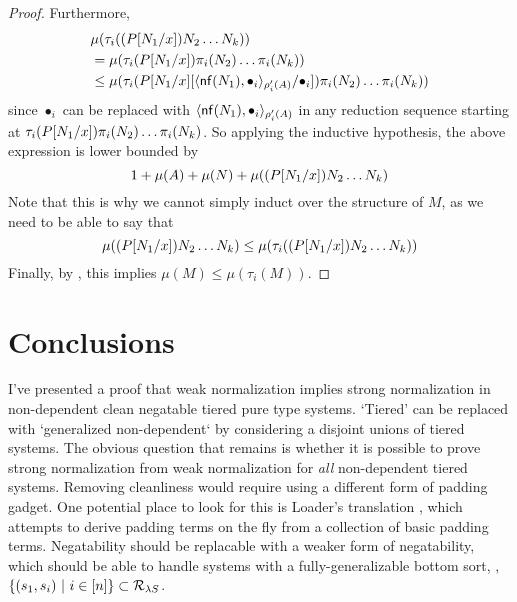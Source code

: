 \documentclass{article}
\begin{document}
\begin{proof}
Furthermore,
\begin{align*}
    & \mu(\tau_i((\sub P {N_1} x)N_2 \dots N_k)) \\ &=
     \mu(\tau_i(\sub P {N_1} x) \pi_i(N_2) \dots \pi_i(N_k)) \\ &\leq    
    \mu(\sub{\tau_i(\sub P {N_1} x} {\pair[\rho_i'(A)] {\mathsf{nf}(N_1)} {\bullet_i}} {\bullet_i}) \pi_i(N_2) \dots \pi_i(N_k))
\end{align*}
since $\bullet_i$ can be replaced with $\pair[\rho_i'(A)] {\mathsf{nf}(N_1)} {\bullet_i}$ in any reduction sequence starting at $\tau_i(\sub P {N_1} x) \pi_i(N_2) \dots \pi_i(N_k)$.
So applying the inductive hypothesis, the above expression is lower bounded by
\[
    1 + \mu(A) + \mu(N) + \mu((\sub P {N_1} x)N_2 \dots N_k)
\]
Note that this is why we cannot simply induct over the structure of $M$, as we need to be able to say that
\[
    \mu((\sub P {N_1} x)N_2 \dots N_k) \leq \mu(\tau_i((\sub P {N_1} x)N_2 \dots N_k))
\]
Finally, by , this implies $\mu(M) \leq \mu(\tau_i(M))$.
\end{proof}

\section{Conclusions}

I've presented a proof that weak normalization implies strong normalization in non-dependent clean negatable tiered pure type systems.
`Tiered' can be replaced with `generalized non-dependent` by considering a disjoint unions of tiered systems.
The obvious question that remains is whether it is possible to prove strong normalization from weak normalization for \textit{all} non-dependent tiered systems.
Removing cleanliness would require using a different form of padding gadget.
One potential place to look for this is Loader's translation \cite{loader-1995}, which attempts to derive padding terms on the fly from a collection of basic padding terms.
Negatability should be replacable with a weaker form of negatability, which should be able to handle systems with a fully-generalizable bottom sort, \ie, $\setcomp {(s_1, s_i)}{i \in \upto n} \subset \rules_{\lS}$.



\end{document}
